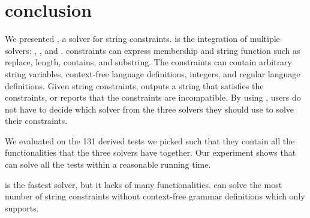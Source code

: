 \section{conclusion}
\label{sec:conclusion}
We presented \imss, a solver for string constraints. \imss is the integration of
multiple solvers: \hampi, \dprle, and \zstr. \imss constraints can express
membership and string function such as replace, length, contains, and substring. The constraints
can contain arbitrary string variables, context-free language definitions, integers,
and regular language definitions. Given string constraints, \imss outputs
a string that satisfies the constraints, or reports that the constraints are incompatible.
By using \imss, users do not have to decide which solver from the three solvers
they should use to solve their constraints.

We evaluated \imss on the 131 derived tests we picked such that they contain all the functionalities
that the three solvers have together. Our experiment shows that \imss can solve all the tests
within a reasonable running time.

\dprle is the fastest solver, but it lacks of many functionalities. \zstr can solve
the most number of string constraints without context-free grammar definitions which only
\hampi supports.
